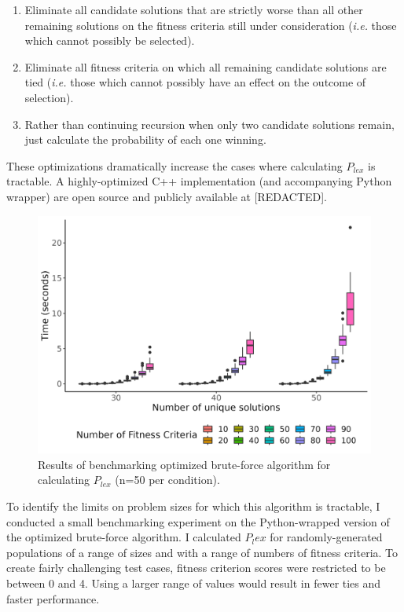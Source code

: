 \documentclass[sigconf]{acmart}
\begin{document}
\begin{enumerate}
    \item Eliminate all candidate solutions that are strictly worse than all other remaining solutions on the fitness criteria still under consideration (\textit{i.e.} those which cannot possibly be selected).
    \item Eliminate all fitness criteria on which all remaining candidate solutions are tied (\textit{i.e.} those which cannot possibly have an effect on the outcome of selection).
    \item Rather than continuing recursion when only two candidate solutions remain, just calculate the probability of each one winning. 
\end{enumerate}

These optimizations dramatically increase the cases where calculating $P_{lex}$ is tractable. A highly-optimized C++ implementation (and accompanying Python wrapper) are open source and publicly available at [REDACTED].

\begin{figure}
    \centering
    \includegraphics[width=\linewidth]{figs/benchmark.png}
    \caption{Results of benchmarking optimized brute-force algorithm for calculating $P_{lex}$ (n=50 per condition).}
    \label{fig:benchmark}
\end{figure}

To identify the limits on problem sizes for which this algorithm is tractable, I conducted a small benchmarking experiment on the Python-wrapped version of the optimized brute-force algorithm. I calculated $P_lex$ for randomly-generated populations of a range of sizes and with a range of numbers of fitness criteria. To create fairly challenging test cases, fitness criterion scores were restricted to be between 0 and 4. Using a larger range of values would result in fewer ties and faster performance.
\end{document}

